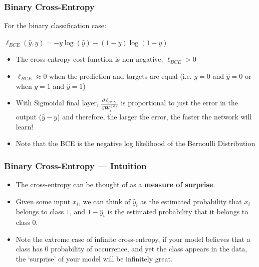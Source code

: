 \documentclass[\beamerclass]{beamer}
\begin{document}
\begin{frame}[fragile]\frametitle{Binary Cross-Entropy}

For the binary classification case:\\
\begin{center}
$\ell_{BCE}(\hat y, y) = -y \log(\hat y) - (1 - y) \log (1 - \hat y)$  
\end{center}

\begin{itemize}

\item The cross-entropy cost function is non-negative, $\ell_{BCE} > 0$
\item $\ell_{BCE} \approx 0 $ when the prediction and targets are equal (i.e. $y = 0$ and $\hat y = 0$ or when $y = 1$ and $\hat y = 1$)
\item With Sigmoidal final layer, $\frac{\partial \ell_{BCE}}{\partial \bm W^{(2)}_{i}} $ is proportional to just the error in the output ($\hat y - y$) and therefore, the larger the error, the faster the network will learn! %
\item<+-> Note that the BCE is the negative log likelihood of the Bernoulli Distribution
\end{itemize}

\end{frame}

\begin{frame}[fragile]\frametitle{Binary Cross-Entropy --- Intuition}
\begin{itemize}
\item The cross-entropy can be thought of as a {\bf measure of surprise}.
\item Given some input $x_i$, we can think of $\hat y_i$ as the estimated probability that $x_i$ belongs to class $1$, and $1-\hat y_i$ is the estimated probability that it belongs to class $0$.
\item Note the extreme case of infinite cross-entropy, if your model believes that a class has 0 probability of occurrence, and yet the class appears in the data, the `surprise' of your model will be infinitely great. 
\end{itemize}
\end{frame}
\end{document}
